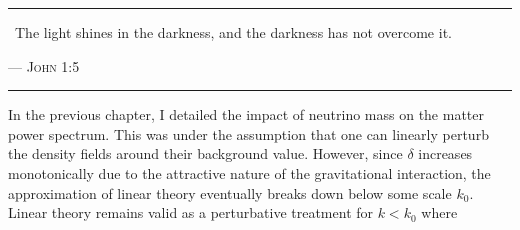 \vspace*{3pc}
\begin{center}
\begin{minipage}{0.7\linewidth}
\hrule
\vspace{8pt}
{\huge\guillemotleft} ~The light shines in the darkness, and the darkness has not overcome it. {\huge\guillemotright}  \\
\vspace{2pt}
\begin{flushright}
--- \textsc{John 1:5}
\end{flushright}
\vspace{8pt}
\hrule
\end{minipage}
\end{center}
\vspace{3pc}

\begin{intro}
{\color{purple}I}n the previous chapter, I detailed the impact of neutrino mass on the matter power spectrum. This was under the assumption that one can linearly perturb the density fields around their background value. However, since $\delta$ increases monotonically due to the attractive nature of the gravitational interaction, the approximation of linear theory eventually breaks down below some scale $k_0$. Linear theory remains valid as a perturbative treatment for $k < k_0$ where \\
\end{intro} 
